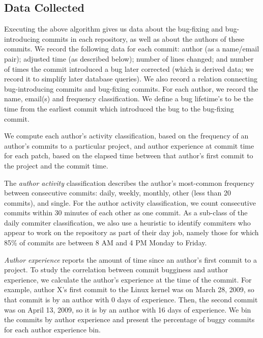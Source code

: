 \subsection{Data Collected}
\label{sec:data}
Executing the above algorithm gives us data about the bug-fixing
and bug-introducing commits
in each repository, as well as about the authors of these commits.  
We record the following data for each commit: author (as a name/email
pair); adjusted time (as described below); number of lines changed; 
and number of times the
commit introduced a bug later corrected (which is derived data; we
record it to simplify later database queries). We also record a
relation connecting bug-introducing commits and bug-fixing
commits. For each author, we record the name, email(s) and
frequency classification. We define a bug lifetime's to be the time from the
earliest commit which introduced the bug to the bug-fixing commit.


We compute each author's activity classification, based on the frequency
of an author's commits to a particular project, and author experience
at commit time for each patch, 
based on the elapsed time between that author's
first commit to the project and the commit time.

The {\em author activity} classification describes the author's
most-common frequency between consecutive commits: daily, weekly,
monthly, other (less than 20 commits), and single. For the author
activity classification, we count consecutive commits within 30
minutes of each other as one commit. As a sub-class of the daily
commiter classification, we also use a heuristic to identify commiters
who appear to work on the repository as part of their day job, namely
those for which 85\% of commits are between 8 AM and 4 PM Monday to
Friday.

{\em Author experience} reports the amount of time since an author's
first commit to a project. To study the correlation
between commit bugginess and author experience, we calculate the
author's experience at the time of the commit.  For example, author
X's first commit to the Linux kernel was on March 28, 2009, so that
commit is by an author with 0 days of experience. Then, the second
commit was on April 13, 2009, so it is by an author with 16 days of
experience. We bin the commits by author experience and present the
percentage of buggy commits for each author experience bin.
 
